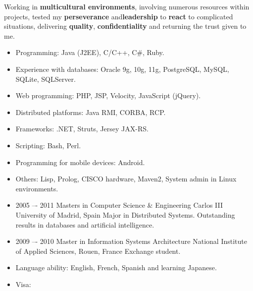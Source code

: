 \documentclass{template/resume}
\begin{document}
\header{\name}{\email}{\address}

Working in \textbf{multicultural environments}, involving numerous
resources within projects, tested my \textbf{perseverance}
and\textbf{leadership} to \textbf{react} to complicated situations,
delivering \textbf{quality}, \textbf{confidentiality} and returning the
trust given to me.

\begin{itemize}
  \itemsep3pt \parskip0pt  
  \item Programming: Java (J2EE), C/C++, C\#, Ruby.
  \item Experience with databases: Oracle 9g, 10g, 11g, PostgreSQL, MySQL, SQLite, SQLServer.
  \item Web programming: PHP, JSP, Velocity, JavaScript (jQuery).
  \item Distributed platforms: Java RMI, CORBA, RCP.
  \item Frameworks: .NET, Struts, Jersey JAX-RS.
  \item Scripting: Bash, Perl.
  \item Programming for mobile devices: Android.
  \item Others: Lisp, Prolog, CISCO hardware, Maven2, System admin in Linux environments.
\end{itemize}

  

\begin{itemize}
  \itemsep3pt \parskip0pt 
  \item 
    \education
      {2005 –- 2011}
      {Masters in Computer Science \& Engineering}
      {Carlos III University of Madrid, Spain}
      {Major in Distributed Systems. Outstanding results in databases and artificial intelligence.}
  \item 
    \education
      {2009 –- 2010}
      {Master in Information Systems Architecture}
      {National Institute of Applied Sciences, Rouen, France}
      {Exchange student.} 
\end{itemize}

\begin{itemize}
  \itemsep3pt \parskip0pt  
  \item Language ability: English, French, Spanish and learning Japanese.
  \item Visa: \visa 
\end{itemize}
\end{document}
